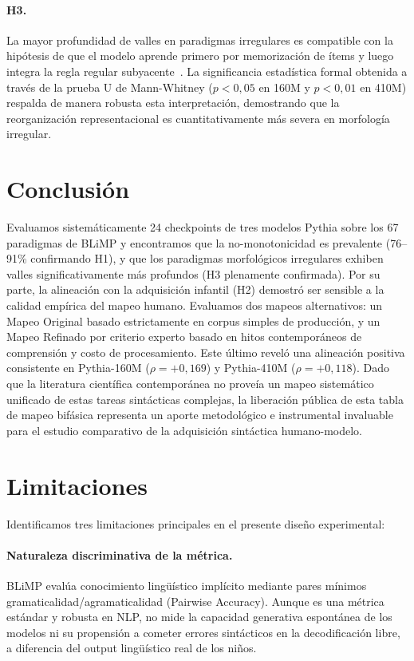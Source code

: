 \documentclass[11pt]{article}
\begin{document}
\paragraph{H3.} La mayor profundidad de valles en paradigmas irregulares es compatible con la hipótesis de que el modelo aprende primero por memorización de ítems y luego integra la regla regular subyacente~\cite{marcus1992overregularization}. La significancia estadística formal obtenida a través de la prueba U de Mann-Whitney ($p < 0{,}05$ en 160M y $p < 0{,}01$ en 410M) respalda de manera robusta esta interpretación, demostrando que la reorganización representacional es cuantitativamente más severa en morfología irregular.

\section{Conclusión}
\label{sec:conclusion}

Evaluamos sistemáticamente 24 checkpoints de tres modelos Pythia sobre los 67 paradigmas de BLiMP y encontramos que la no-monotonicidad es prevalente (76--91\% confirmando H1), y que los paradigmas morfológicos irregulares exhiben valles significativamente más profundos (H3 plenamente confirmada). Por su parte, la alineación con la adquisición infantil (H2) demostró ser sensible a la calidad empírica del mapeo humano. Evaluamos dos mapeos alternativos: un Mapeo Original basado estrictamente en corpus simples de producción, y un Mapeo Refinado por criterio experto basado en hitos contemporáneos de comprensión y costo de procesamiento. Este último reveló una alineación positiva consistente en Pythia-160M ($\rho = +0{,}169$) y Pythia-410M ($\rho = +0{,}118$). Dado que la literatura científica contemporánea no proveía un mapeo sistemático unificado de estas tareas sintácticas complejas, la liberación pública de esta tabla de mapeo bifásica representa un aporte metodológico e instrumental invaluable para el estudio comparativo de la adquisición sintáctica humano-modelo.

\section*{Limitaciones}

Identificamos tres limitaciones principales en el presente diseño experimental:

\paragraph{Naturaleza discriminativa de la métrica.} BLiMP evalúa conocimiento lingüístico implícito mediante pares mínimos gramaticalidad/agramaticalidad (Pairwise Accuracy). Aunque es una métrica estándar y robusta en NLP, no mide la capacidad generativa espontánea de los modelos ni su propensión a cometer errores sintácticos en la decodificación libre, a diferencia del output lingüístico real de los niños.
\end{document}
